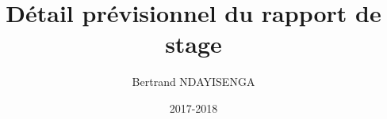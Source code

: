\documentclass[a4paper,10pt]{report}
\title{Détail prévisionnel du rapport de stage} \let\Title\@title
\author{Bertrand NDAYISENGA} \let\Author\@author
\date{2017-2018} \let\Date\@date
\begin{document}












 \centering 
 
 
 
 
\end{document}
